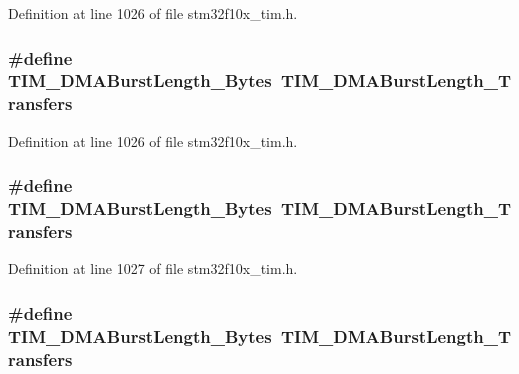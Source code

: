 Definition at line 1026 of file stm32f10x\+\_\+tim.\+h.

\subsubsection[{\texorpdfstring{T\+I\+M\+\_\+\+D\+M\+A\+Burst\+Length\+\_\+7\+Bytes}{TIM_DMABurstLength_7Bytes}}]{\setlength{\rightskip}{0pt plus 5cm}\#define T\+I\+M\+\_\+\+D\+M\+A\+Burst\+Length\+\_\+Bytes~{\bf T\+I\+M\+\_\+\+D\+M\+A\+Burst\+Length\+\_\+Transfers}}\hypertarget{group___t_i_m___legacy_ga5833cc5442c40a97a6a90bcd34a2e773}{}\label{group___t_i_m___legacy_ga5833cc5442c40a97a6a90bcd34a2e773}


Definition at line 1026 of file stm32f10x\+\_\+tim.\+h.

\subsubsection[{\texorpdfstring{T\+I\+M\+\_\+\+D\+M\+A\+Burst\+Length\+\_\+8\+Bytes}{TIM_DMABurstLength_8Bytes}}]{\setlength{\rightskip}{0pt plus 5cm}\#define T\+I\+M\+\_\+\+D\+M\+A\+Burst\+Length\+\_\+Bytes~{\bf T\+I\+M\+\_\+\+D\+M\+A\+Burst\+Length\+\_\+Transfers}}\hypertarget{group___t_i_m___legacy_gab7c002a9f06f7c238e15a0c61f047062}{}\label{group___t_i_m___legacy_gab7c002a9f06f7c238e15a0c61f047062}


Definition at line 1027 of file stm32f10x\+\_\+tim.\+h.

\subsubsection[{\texorpdfstring{T\+I\+M\+\_\+\+D\+M\+A\+Burst\+Length\+\_\+8\+Bytes}{TIM_DMABurstLength_8Bytes}}]{\setlength{\rightskip}{0pt plus 5cm}\#define T\+I\+M\+\_\+\+D\+M\+A\+Burst\+Length\+\_\+Bytes~{\bf T\+I\+M\+\_\+\+D\+M\+A\+Burst\+Length\+\_\+Transfers}}\hypertarget{group___t_i_m___legacy_gab7c002a9f06f7c238e15a0c61f047062}{}\label{group___t_i_m___legacy_gab7c002a9f06f7c238e15a0c61f047062}


